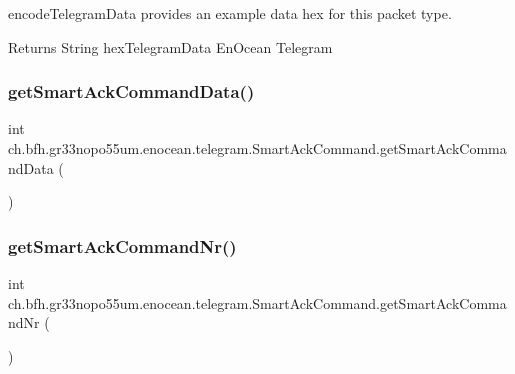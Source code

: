encode\+Telegram\+Data provides an example data hex for this packet type.

\begin{DoxyReturn}{Returns}
String hex\+Telegram\+Data En\+Ocean Telegram 
\end{DoxyReturn}
\hypertarget{classch_1_1bfh_1_1gr33nopo55um_1_1enocean_1_1telegram_1_1_smart_ack_command_aed09fa831f87270405779ccc8f549edd}{}\label{classch_1_1bfh_1_1gr33nopo55um_1_1enocean_1_1telegram_1_1_smart_ack_command_aed09fa831f87270405779ccc8f549edd} 
\subsubsection{\texorpdfstring{get\+Smart\+Ack\+Command\+Data()}{getSmartAckCommandData()}}
{\footnotesize\ttfamily int ch.\+bfh.\+gr33nopo55um.\+enocean.\+telegram.\+Smart\+Ack\+Command.\+get\+Smart\+Ack\+Command\+Data (\begin{DoxyParamCaption}{ }\end{DoxyParamCaption})}

\hypertarget{classch_1_1bfh_1_1gr33nopo55um_1_1enocean_1_1telegram_1_1_smart_ack_command_aa905bf545db04f358813cd12a3e628c7}{}\label{classch_1_1bfh_1_1gr33nopo55um_1_1enocean_1_1telegram_1_1_smart_ack_command_aa905bf545db04f358813cd12a3e628c7} 
\subsubsection{\texorpdfstring{get\+Smart\+Ack\+Command\+Nr()}{getSmartAckCommandNr()}}
{\footnotesize\ttfamily int ch.\+bfh.\+gr33nopo55um.\+enocean.\+telegram.\+Smart\+Ack\+Command.\+get\+Smart\+Ack\+Command\+Nr (\begin{DoxyParamCaption}{ }\end{DoxyParamCaption})}


